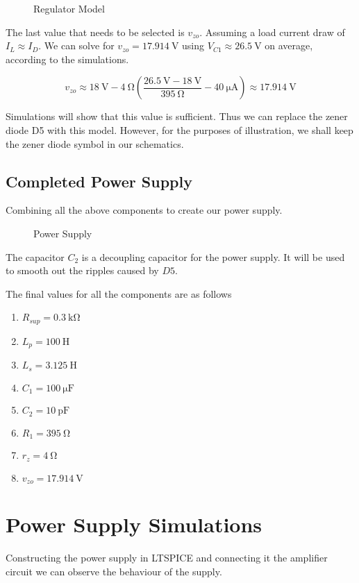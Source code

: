 \documentclass[journal]{IEEEtran}
\begin{document}
\begin{figure}[H]
	\centering
	
	\caption{Regulator Model\cite{roberts_2017_diodes}}
	\label{zenermodel}
\end{figure}

The last value that needs to be selected is $v_{zo}$. Assuming a load current draw of $I_L \approx I_D$. We can solve for $v_{zo} = \SI{17.914}{\volt}$ using $V_{C1} \approx \SI{26.5}{\volt}$ on average, according to the simulations.

$$ v_{zo} \approx \SI{18}{\volt} - \SI{4}{\ohm}\left( \frac{ \SI{26.5}{\volt} - \SI{18}{\volt} } {\SI{395}{\ohm}} - \SI{40}{\micro\ampere} \right) \approx \SI{17.914}{\volt} $$

Simulations will show that this value is sufficient. Thus we can replace the zener diode D5 with this model. However, for the purposes of illustration, we shall keep the zener diode symbol in our schematics.

\subsection{Completed Power Supply}

Combining all the above components to create our power supply.

\begin{figure}[H]
	\centering
	
	\caption{Power Supply \cite{roberts_2017_diodes}}
	\label{ps}
\end{figure}

The capacitor $C_2$ is a decoupling capacitor for the power supply. It will be used to smooth out the ripples caused by $D5$.

The final values for all the components are as follows
\begin{enumerate}
	\item $R_{sup} = \SI{0.3}{\kilo\ohm}$
	\item $L_p = \SI{100}{\henry}$
	\item $L_s = \SI{3.125}{\henry}$
	\item $C_1 = \SI{100}{\micro\farad}$
	\item $C_2 = \SI{10}{\pico\farad}$
	\item $R_1 = \SI{395}{\ohm}$
	\item $r_z = \SI{4}{\ohm}$
	\item $v_{zo} = \SI{17.914}{\volt}$
\end{enumerate}

\section{Power Supply Simulations}
Constructing the power supply in LTSPICE and connecting it the amplifier circuit we can observe the behaviour of the supply.
\end{document}
